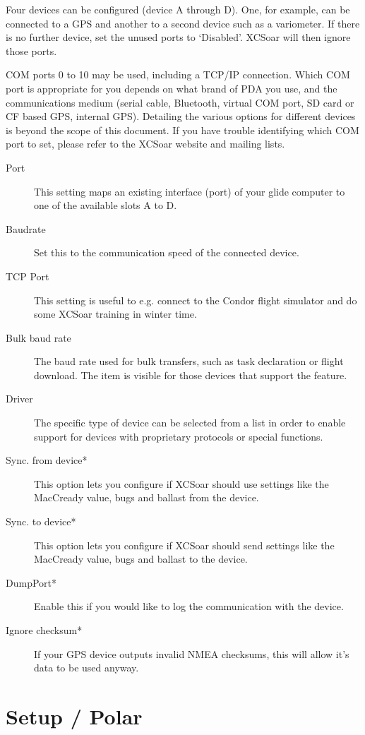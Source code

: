 Four devices can be configured (device A through D). One, for
example, can be connected to a GPS and another to a
second device such as a variometer.  If there is no further device, 
set the unused ports to `Disabled'.  XCSoar will then ignore those ports.

COM ports 0 to 10 may be used, including a TCP/IP connection.  
Which COM port is appropriate for you
depends on what brand of PDA you use, and the communications medium
(serial cable, Bluetooth, virtual COM port, SD card or CF based GPS,
internal GPS).  Detailing the various options for different devices is
beyond the scope of this document.  If you have trouble identifying
which COM port to set, please refer to the XCSoar website and mailing
lists.

\begin{description}
\item[Port]  This setting maps an existing interface (port) of your 
  glide computer to one of the available slots A to D.
\item[Baudrate]  Set this to the communication speed of the connected device.
\item[TCP Port]  This setting is useful to e.g. connect to the Condor flight
  simulator and do some XCSoar training in winter time.
\item[Bulk baud rate]  The baud rate used for bulk transfers, such 
  as task declaration or flight download. The item is visible for those 
  devices that support the feature.
\item[Driver]  The specific type of device can be selected from a list in order
  to enable support for devices with proprietary protocols or special
  functions.
\item[Sync. from device*]  This option lets you configure if XCSoar should use settings 
  like the MacCready value, bugs and ballast from the device.
\item[Sync. to device*]  This option lets you configure if XCSoar should send settings 
  like the MacCready value, bugs and ballast to the device.
\item[DumpPort*]  Enable this if you would like to log the communication with the device.
\item[Ignore checksum*] If your GPS device outputs invalid NMEA checksums, this 
  will allow it's data to be used anyway.
\end{description}


\section{Setup / Polar}

